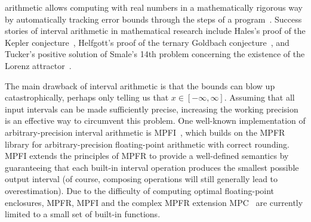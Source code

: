 \documentclass[10pt,journal,compsoc,cspaper]{IEEEtran}
\begin{document}
\maketitle


\IEEEdisplaynontitleabstractindextext



%
\IEEEpeerreviewmaketitle




 arithmetic allows computing
with real numbers in a mathematically rigorous
way by automatically tracking error bounds
through the steps of a program~\cite{tucker2011validated}.
Success stories of interval arithmetic in
mathematical research include Hales's proof of the
Kepler conjecture~\cite{hales2011revision},
Helfgott's proof of the ternary Goldbach conjecture~\cite{helfgott2015},
and Tucker's positive solution
of Smale's 14th problem concerning the existence
of the Lorenz attractor~\cite{tucker2002rigorous}.

The main drawback of interval arithmetic
is that the bounds can blow up catastrophically,
perhaps only telling us that $x \in [-\infty,\infty]$.
Assuming that all input intervals can be made
sufficiently precise, increasing the working precision is an effective way
to circumvent this problem.
One well-known implementation of arbitrary-precision
interval arithmetic is MPFI~\cite{RevolRouillier2005},
which builds on the MPFR~\cite{Fousse2007} library for
arbitrary-precision floating-point
arithmetic with correct rounding.
MPFI extends the principles of MPFR to provide a well-defined semantics
by guaranteeing that each built-in interval operation produces the
smallest possible output interval (of course, composing operations will
still generally lead to overestimation).
Due to the difficulty of computing optimal floating-point
enclosures,
MPFR, MPFI and the complex MPFR extension MPC~\cite{enge2011mpc} are
currently limited to a small set of built-in functions.
\end{document}
